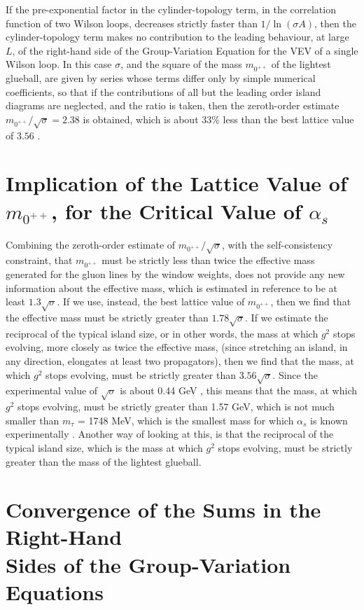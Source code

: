 \documentclass[a4paper,12pt,oneside]{article}
\begin{document}
If the pre-exponential factor in the cylinder-topology term, in the
correlation function of two Wilson loops, decreases strictly faster than
$1/\ln(\sigma A)$, then the cylinder-topology term makes no contribution to
the leading behaviour, at large $L$, of the right-hand side of the
Group-Variation Equation for the VEV of a single Wilson loop.  In this case
$\sigma$, and the square of the mass $m_{0^{++}}$ of the lightest glueball,
are given by series whose terms differ only by simple numerical
coefficients, so that if the contributions of all but the leading order
island diagrams are neglected, and the ratio is taken, then the zeroth-order
estimate $m_{0^{++}}/\sqrt{\sigma}=2.38$ is obtained, which is about 33\%
less than the best lattice value of $3.56$ \cite{Teper}.

\section{Implication of the Lattice Value of $m_{0^{++}}$, for the 
Critical Value of $\alpha_s$}

Combining the zeroth-order estimate of $m_{0^{++}}/\sqrt{\sigma}$, with the
self-consistency constraint, that $m_{0^{++}}$ must be strictly less than
twice the effective mass generated for the gluon lines by the window
weights, does not provide any new information about the effective mass,
which is estimated in reference \cite{GVE} to be at least $1.3\sqrt{\sigma}$.  If we
use, instead, the best lattice value of $m_{0^{++}}$, then we find that the
effective mass must be strictly greater than $1.78\sqrt{\sigma}$.  If we
estimate the reciprocal of the typical island size, or in other words, the
mass at which $g^2$ stops evolving, more closely as twice the effective
mass, (since stretching an island, in any direction, elongates at least two
propagators), then we find that the mass, at which $g^2$ stops evolving,
must be strictly greater than $3.56\sqrt{\sigma}$.  Since the experimental
value of $\sqrt{\sigma}$ is about 0.44 GeV \cite{Michael}, this means that the mass, at
which $g^2$ stops evolving, must be strictly greater than 1.57 GeV, which is
not much smaller than $m_\tau$ = 1748 MeV, which is the smallest mass for
which $\alpha_s$ is known experimentally \cite{beta in MS bar 1}.
Another way of looking at this, is that the reciprocal of the typical
island size, which is the mass at which $g^2$ stops evolving, must be
strictly greater than the mass of the lightest glueball.

\section{Convergence of the Sums in the Right-Hand \\Sides of the
Group-Variation Equations}
\label{Convergence}
\end{document}
